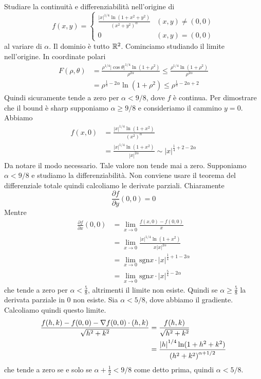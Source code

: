 \documentclass[a4paper]{article}
\begin{document}
\begin{radioactive}
\begin{snippetexercise}{}
    Studiare la continuità e differenziabilità nell'origine di
    \[
        f(x,y) = \begin{cases}
            \frac{|x|^{1/4} \ln(1 + x^2 + y^2)}{{(x^2 + y^2)}^\alpha} & (x,y) \neq (0,0) \\
            0 & (x,y) = (0,0)
        \end{cases}
    \]
    al variare di \(\alpha\). Il dominio è tutto \(\mathbb{R}^2\).
    Cominciamo studiando il limite nell'origine. In coordinate polari
    \begin{align*}
        F(\rho,\theta) &= \frac{\rho^{1/4} {|\cos\theta|}^{1/4} \ln(1 + \rho^2)}{\rho^{2\alpha}}
        \leq \frac{\rho^{1/4} \ln(1 + \rho^2)}{\rho^{2\alpha}} \\
        &= \rho^{\frac{1}{4} - 2 \alpha} \ln(1 + \rho^2) \leq \rho^{\frac{1}{4} - 2 \alpha + 2}
    \end{align*}
    Quindi sicuramente tende a zero per \(\alpha < 9/8\), dove \(f\) è continua.
    Per dimostrare che il bound è sharp supponiamo \(\alpha \geq 9/8\) e consideriamo il cammino
    \(y=0\). Abbiamo
    \begin{align*}
        f(x,0) &= \frac{{|x|}^{1/4} \ln(1 + x^2)}{{(x^2)}^\alpha} \\
        &= \frac{{|x|}^{1/4} \ln(1 + x^2)}{{|x|}^{2\alpha}}
        \sim {|x|}^{\frac{1}{4} + 2 - 2\alpha}
    \end{align*}
    Da notare il modo necessario.
    Tale valore non tende mai a zero.
    Supponiamo \(\alpha < 9/8\)
    e studiamo la differenziabilità.
    Non conviene usare il teorema del differenziale totale quindi calcoliamo le derivate parziali.
    Chiaramente
    \[
        \frac{\partial f}{\partial y}(0,0) = 0
    \]
    Mentre
    \begin{align*}
        \frac{\partial f}{\partial x}(0,0)
        &= \lim_{x\to 0} \frac{f(x,0) - f(0,0)}{x} \\
        &= \lim_{x\to 0} \frac{{|x|}^{1/4} \ln(1 + x^2)}{x{|x|}^{2\alpha}} \\
        &= \lim_{x\to 0} \text{sgn} x \cdot {|x|}^{\frac{1}{4} + 1 - 2\alpha} \\
        &= \lim_{x\to 0} \text{sgn} x \cdot {|x|}^{\frac54 - 2\alpha}
    \end{align*}
    che tende a zero per \(\alpha < \frac58\), altrimenti il limite non esiste.
    Quindi se \(\alpha \geq \frac58\) la derivata parziale in 0 non esiste.
    Sia \(\alpha < 5/8\), dove abbiamo il gradiente. Calcoliamo quindi questo limite.
    \begin{align*}
        \frac{f(h,k) - f(0,0) - \nabla f(0,0) \cdot (h,k)}{\sqrt{h^2 + k^2}}
        &= \frac{f(h,k)}{\sqrt{h^2 + k^2}} \\
        &= \frac{{|h|}^{1/4} \ln(1 + h^2 + k^2)}{{(h^2 + k^2)}^{\alpha + 1/2}}
    \end{align*}
    che tende a zero se e solo se \(\alpha + \frac{1}{2} < 9/8\) come detto prima,
    quindi \(\alpha < 5/8\).
\end{snippetexercise}
\end{radioactive}
\end{document}
